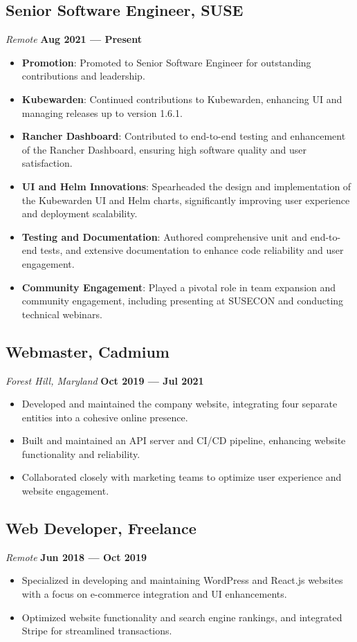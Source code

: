 \documentclass[a4paper,10pt]{article}
\begin{document}
\subsection*{Senior Software Engineer, SUSE}
\textit{Remote} \hfill \textbf{Aug 2021 — Present}
\begin{itemize}[leftmargin=1.5em]
    \item \textbf{Promotion}: Promoted to Senior Software Engineer for outstanding contributions and leadership.
    \item \textbf{Kubewarden}: Continued contributions to Kubewarden, enhancing UI and managing releases up to version 1.6.1.
    \item \textbf{Rancher Dashboard}: Contributed to end-to-end testing and enhancement of the Rancher Dashboard, ensuring high software quality and user satisfaction.
    \item \textbf{UI and Helm Innovations}: Spearheaded the design and implementation of the Kubewarden UI and Helm charts, significantly improving user experience and deployment scalability.
    \item \textbf{Testing and Documentation}: Authored comprehensive unit and end-to-end tests, and extensive documentation to enhance code reliability and user engagement.
    \item \textbf{Community Engagement}: Played a pivotal role in team expansion and community engagement, including presenting at SUSECON and conducting technical webinars.
\end{itemize}

\subsection*{Webmaster, Cadmium}
\textit{Forest Hill, Maryland} \hfill \textbf{Oct 2019 — Jul 2021}
\begin{itemize}[leftmargin=1.5em]
    \item Developed and maintained the company website, integrating four separate entities into a cohesive online presence.
    \item Built and maintained an API server and CI/CD pipeline, enhancing website functionality and reliability.
    \item Collaborated closely with marketing teams to optimize user experience and website engagement.
\end{itemize}

\subsection*{Web Developer, Freelance}
\textit{Remote} \hfill \textbf{Jun 2018 — Oct 2019}
\begin{itemize}[leftmargin=1.5em]
    \item Specialized in developing and maintaining WordPress and React.js websites with a focus on e-commerce integration and UI enhancements.
    \item Optimized website functionality and search engine rankings, and integrated Stripe for streamlined transactions.
\end{itemize}
\end{document}
